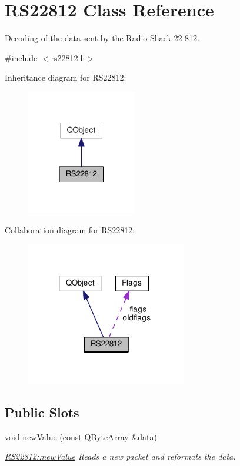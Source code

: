 \hypertarget{class_r_s22812}{\section{R\-S22812 Class Reference}
\label{class_r_s22812}
}


Decoding of the data sent by the Radio Shack 22-\/812.  




{\ttfamily \#include $<$rs22812.\-h$>$}



Inheritance diagram for R\-S22812\-:\nopagebreak
\begin{figure}[H]
\begin{center}
\leavevmode
\includegraphics[width=136pt]{class_r_s22812__inherit__graph}
\end{center}
\end{figure}


Collaboration diagram for R\-S22812\-:\nopagebreak
\begin{figure}[H]
\begin{center}
\leavevmode
\includegraphics[width=198pt]{class_r_s22812__coll__graph}
\end{center}
\end{figure}
\subsection*{Public Slots}
\begin{DoxyCompactItemize}
\item 
void \hyperlink{class_r_s22812_a5de59c9521bc80e37745c8c3243d9229}{new\-Value} (const Q\-Byte\-Array \&data)
\begin{DoxyCompactList}\small\item\em \hyperlink{class_r_s22812_a5de59c9521bc80e37745c8c3243d9229}{R\-S22812\-::new\-Value} Reads a new packet and reformats the data. \end{DoxyCompactList}\end{DoxyCompactItemize}
